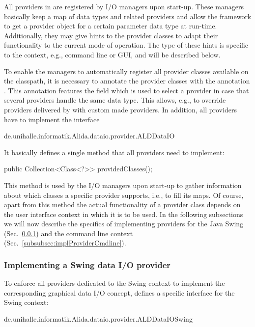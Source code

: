 All providers in \alida are registered by I/O managers upon start-up. These managers basically
keep a map of data types and related providers and allow the framework to get a provider object
for a certain parameter data type at run-time. 
Additionally, they may give hints to the provider classes to adapt their
functionality to the current mode of operation.
The type of these hints is specific to the context, e.g., command line or GUI,
and will be described below.

To enable the managers to automatically register 
all provider classes available on the classpath, it is necessary to annotate the
provider classes with the \alida annotation . 
This annotation features the field  which is used to
select a provider in case that several providers handle the same data type.
This allows, e.g., to override providers delivered by \alida with custom made providers.
In addition, all providers have to 
implement the interface 
\vspace*{0.5cm}
\begin{code}
	de.unihalle.informatik.Alida.dataio.provider.ALDDataIO 
\end{code}

\vspace*{-0.25cm}
It basically defines a single method that all providers need to implement:
\vspace*{0.5cm}
\begin{code}
	public Collection<Class<?>> providedClasses();
\end{code}

\vspace*{-0.25cm}
This method is used by the I/O managers upon start-up to gather information about
which classes a specific provider supports, i.e., to fill its maps. Of course,
apart from this method the actual functionality of a provider class depends on the user interface 
context in which it is to be used. In the following subsections we will now describe the specifics
of implementing providers for the Java Swing (Sec.~\ref{subsubsec:implProviderSwing}) and 
the command line context (Sec.~\ref{subsubsec:implProviderCmdline}).
  
\subsubsection{Implementing a Swing data I/O provider}
\label{subsubsec:implProviderSwing}
To enforce all providers dedicated to the Swing context to implement the corresponding graphical 
data I/O concept, \alida defines a specific interface for the Swing context: 
\vspace*{0.5cm}
\begin{code}
	de.unihalle.informatik.Alida.dataio.provider.ALDDataIOSwing 
\end{code}

